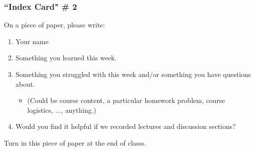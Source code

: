 \documentclass[12pt, 
hyperref={colorlinks=true, linkcolor=blue, urlcolor=cyan}]{beamer}
\begin{document}
\begin{frame}
\frametitle{``Index Card" \# 2}
On a piece of paper, please write:
\begin{enumerate}
\item Your name
\item Something you learned this week.
\item Something you struggled with this week and/or something you have questions about. 
	\begin{itemize}
	\item[] \begin{footnotesize} (Could be course content, a particular homework problem, course logistics, ..., anything.) \end{footnotesize}
	\end{itemize}
\item Would you find it helpful if we recorded lectures and discussion sections?
\end{enumerate}
Turn in this piece of paper at the end of classs.
\end{frame}
\end{document}
